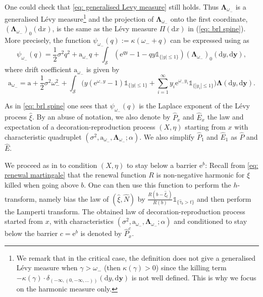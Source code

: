 \documentclass[12pt]{article}
\numberwithin{equation}{section}
\theoremstyle{plain}
\theoremstyle{definition}
\newcommand{\D}{\mathrm{d}}
\newcommand{\Bd}[1]{\boldsymbol{#1}}
\begin{document}
\noindent One could check that \eqref{eq: generalised Levy measure} still holds. Thus $\boldsymbol{\Lambda}_{\omega_-}$ is a generalised L\'evy measure\footnote{We remark that in the critical case, the definition \cite[Equation (5.12)]{BertoinJean2024SMta} does not give a generalised L\'evy measure when $\gamma>\omega_-$ (then $\kappa(\gamma)>0$) since the killing term $-\kappa(\gamma)\cdot\delta_{(-\infty,(0,-\infty,\ldots))}(\D y, \D \boldsymbol{y})$ is not well defined. This is why we focus on the harmonic measure only.} and the projection of $\boldsymbol{\Lambda}_{\omega_-}$ onto the first coordinate, $(\Bd\Lambda_{\omega_-})_0(\D x)$, is the same as the L\'evy measure $\Pi(\D x)$ in (\ref{eq: brl spine}). More precisely, the  function $\psi_{\omega_-}(q) := \kappa(\omega_-+q)$ can be expressed using \cite[Lemma 5.4]{BertoinJean2024SMta} as
\begin{equation}\label{def: psi}
\psi_{\omega_-}(q) = \frac{1}{2}\sigma^2q^2 + \mathrm{a}_{\omega_-}q + \int_{\mathcal{S}} (\mathrm{e}^{qy}-1-qy\mathds{1}_{\{|y|\leq 1\}})(\Bd{\Lambda}_{\omega_-})_0 (\mathrm{d}y, \mathrm{d}\boldsymbol{y}),
\end{equation}
\noindent where drift coefficient $\mathrm{a}_{\omega_-}$ is given by
\begin{equation}\label{eq: a gamma}
\mathrm{a}_{\omega_-} = \mathrm{a} + \frac{1}{2}\sigma^2\omega_-^2 + \int_{\mathcal{S}} \Big(y(\mathrm{e}^{\omega_- y}-1)\mathds{1}_{\{|y|\leq 1\}} + \sum^{\infty}_{i=1} y_i\mathrm{e}^{\omega_- y_i} \mathds{1}_{\{|y_i|\leq 1\}}\Big)\Bd\Lambda(\D y, \D\Bd y).
\end{equation}

\noindent As in \eqref{eq: brl spine} one sees that $\psi_{\omega_-}(q)$ is the Laplace exponent of the  L\'evy process $\hat{\xi}$. By an abuse of notation, we also denote by $\hat{P}_x$ and $\hat{E}_x $ the law and expectation of a decoration-reproduction process $(X,\eta)$ starting from $x$ with characteristic quadruplet $(\sigma^2, \mathrm{a}_{\omega_-}, \Bd\Lambda_{\omega_-};\alpha)$. We also simplify $\hat{P}_1$ and $\hat{E}_1$ as $\hat{P}$ and $\hat{E}$.

We proceed as in \cite[Section 3.2]{MalleinBastien2023Anas} to condition $(X,\eta)$ to stay below a barrier $ \mathrm{e}^b$: Recall from \eqref{eq: renewal martingale} that the renewal function $R$ is non-negative harmonic for $\hat{\xi}$ killed when going above $b$. One can then use this function to perform the $h$-transform, namely bias the law of $(\hat{\xi}, \hat{N})$ by $\frac{R(b-\hat{\xi}_t)}{R(b)}\mathds{1}_{\{\hat{\tau}_{b}>t\}}$ and then perform the Lamperti transform. The obtained law of decoration-reproduction process started from $x$, with characteristics $(\sigma^2, \mathrm{a}_{\omega_-}, \Bd\Lambda_{\omega_-};\alpha)$ and conditioned to stay below the barrier $ c=\mathrm{e}^b$ is denoted by $\hat{P}^{c}_x$.
\end{document}
